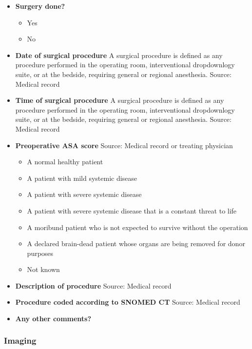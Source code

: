 \documentclass[
]{scrartcl}
\providecommand{\tightlist}{%
  \setlength{\itemsep}{0pt}\setlength{\parskip}{0pt}}\usepackage{longtable,booktabs,array}
\begin{document}
\begin{itemize}
\item
  \textbf{Surgery done?}

  \begin{itemize}
  \tightlist
  \item
    Yes
  \item
    No
  \end{itemize}
\item
  \textbf{Date of surgical procedure} A surgical procedure is defined as
  any procedure performed in the operating room, interventional
  dropdownlogy suite, or at the bedside, requiring general or regional
  anesthesia. Source: Medical record
\item
  \textbf{Time of surgical procedure} A surgical procedure is defined as
  any procedure performed in the operating room, interventional
  dropdownlogy suite, or at the bedside, requiring general or regional
  anesthesia. Source: Medical record
\item
  \textbf{Preoperative ASA score} Source: Medical record or treating
  physician

  \begin{itemize}
  \tightlist
  \item
    A normal healthy patient
  \item
    A patient with mild systemic disease
  \item
    A patient with severe systemic disease
  \item
    A patient with severe systemic disease that is a constant threat to
    life
  \item
    A moribund patient who is not expected to survive without the
    operation
  \item
    A declared brain-dead patient whose organs are being removed for
    donor purposes
  \item
    Not known
  \end{itemize}
\item
  \textbf{Description of procedure} Source: Medical record
\item
  \textbf{Procedure coded according to SNOMED CT} Source: Medical record
\item
  \textbf{Any other comments?}
\end{itemize}

\subsubsection{Imaging}\label{imaging}
\end{document}
